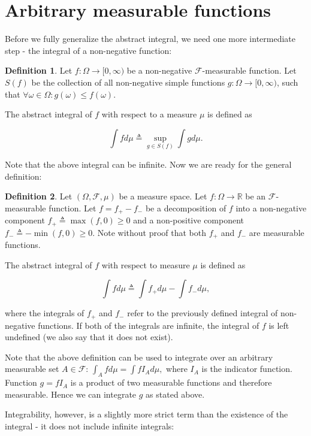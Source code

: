 \documentclass{book}
\theoremstyle{plain}%
\theoremstyle{definition}
\newtheorem{definition}{Definition}[section]
\newlength{\arrow}
\begin{document}
\section{Arbitrary measurable functions}

Before we fully generalize the abstract integral, we need one more intermediate step - the integral of a non-negative function:

\begin{definition}
Let $f: \Omega \rightarrow [0, \infty)$ be a non-negative $\mathcal{F}$-measurable function. Let $S(f)$ be the collection of all non-negative simple functions $g: \Omega \rightarrow [0, \infty)$, such that $\forall \omega \in \Omega: g(\omega) \leq f(\omega)$.

The abstract integral of $f$ with respect to a measure $\mu$ is defined as

$$\int f d\mu \triangleq \sup_{g \in S(f)} \int g d\mu.$$
\end{definition}

Note that the above integral can be infinite. Now we are ready for the general definition:

\begin{definition}
Let $(\Omega, \mathcal{F}, \mu)$ be a measure space. Let $f: \Omega \rightarrow \mathbb{R}$ be an $\mathcal{F}$-measurable function. Let $f = f_+ - f_-$ be a decomposition of $f$ into a non-negative component $f_+ \triangleq \max(f,0) \geq 0$ and a non-positive component $f_- \triangleq -\min(f,0) \geq 0$. Note without proof that both $f_+$ and $f_-$ are measurable functions.

The abstract integral of $f$ with respect to measure $\mu$ is defined as

$$\int f d\mu \triangleq \int f_+ d\mu - \int f_- d\mu,$$

where the integrals of $f_+$ and $f_-$ refer to the previously defined integral of non-negative functions. If both of the integrals are infinite, the integral of $f$ is left undefined (we also say that it does not exist).
\end{definition}

Note that the above definition can be used to integrate over an arbitrary measurable set $A \in \mathcal{F}$: $\int_A f d\mu = \int fI_A d\mu,$ where $I_A$ is the indicator function. Function $g = fI_A$ is a product of two measurable functions and therefore measurable. Hence we can integrate $g$ as stated above.

Integrability, however, is a slightly more strict term than the existence of the integral - it does not include infinite integrals:
\end{document}
